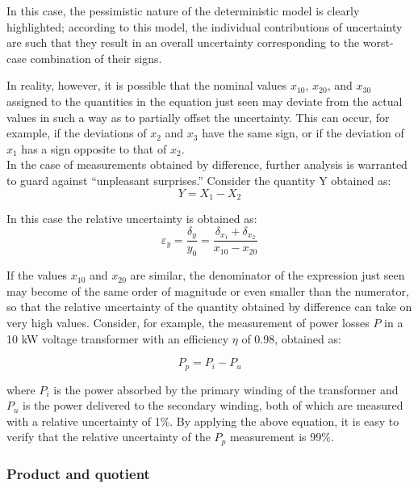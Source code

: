 \documentclass[../main.tex]{subfiles}
\begin{document}
In this case, the pessimistic nature of the deterministic model is clearly highlighted; according to this model, the individual contributions of uncertainty are such that they result in an overall uncertainty corresponding to the worst-case combination of their signs. 

In reality, however, it is possible that the nominal values $x_{10}$, $x_{20}$, and $x_{30}$ assigned to the quantities in the equation just seen may deviate from the actual values in such a way as to partially offset the uncertainty. This can occur, for example, if the deviations of $x_2$ and $x_3$ have the same sign, or if the deviation of $x_1$ has a sign opposite to that of $x_2$.\\

In the case of measurements obtained by difference, further analysis is warranted to guard against “unpleasant surprises.” 
Consider the quantity Y obtained as:\\

\begin{equation}
	Y = X_1 - X_2
\end{equation}

In this case the relative uncertainty is obtained as:\\

\begin{equation}
	\varepsilon_y = \frac{\delta_y}{y_0} = \frac{\delta_{x_1} + \delta_{x_2}}{x_{10} - x_{20}}
\end{equation}

If the values $x_{10}$ and $x_{20}$ are similar, the denominator of the expression just seen may become of the same order of magnitude or even smaller than the numerator, so that the relative uncertainty of the quantity obtained by difference can take on very high values. Consider, for example, the measurement of power losses $P$ in a 10 kW voltage transformer with an efficiency $\eta$ of 0.98, obtained as:

\begin{equation}
	P_p = P_i - P_u	
\end{equation}


where $P_i$ is the power absorbed by the primary winding of the transformer and $P_u$ is the power delivered to the secondary winding, both of which are measured with a relative uncertainty of 1\%. By applying the above equation, it is easy to verify that the relative uncertainty of the $P_p$ measurement is 99\%.

\subsubsection*{Product and quotient}
\end{document}
